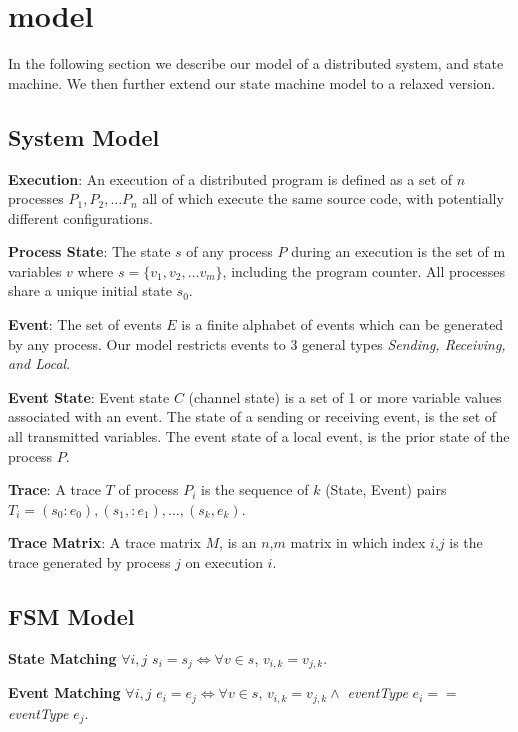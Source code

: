 \section{model}
\label{sec:model}

In the following section we describe our model of a distributed system, and
state machine. We then further extend our state machine model to a relaxed
version.


\subsection{System Model}

\noindent\textbf{Execution}: An execution of a distributed program is defined as a set
of $n$ processes $P_1, P_2, \dots P_n$ all of which execute the same source
code, with potentially different configurations.

\noindent\textbf{Process State}: The state $s$ of any process $P$ during an
execution is the set of m variables $v$ where $s = \{ v_1, v_2, \dots v_m \}$,
including the program counter.  All processes share a unique initial state
$s_0$.

\noindent\textbf{Event}: The set of events $E$ is a finite alphabet of events which can
be generated by any process. Our model restricts events to 3 general types
\textit{Sending, Receiving, and Local}.

\noindent\textbf{Event State}: Event state $C$ (channel state) is a set of 1 or more
variable values associated with an event. The state of a sending or receiving
event, is the set of all transmitted variables. The event state of a local
event, is the prior state of the process $P$.

\noindent\textbf{Trace}: A trace $T$ of process $P_i$ is the sequence of $k$ (State,
Event) pairs $T_i = {(s_0:e_0),(s_1,:e_1), \dots ,(s_k,e_k)}$.

\noindent\textbf{Trace Matrix}: A trace matrix $M$, is an $n$,$m$ matrix in which index
$i$,$j$ is the trace generated by process $j$ on execution $i$.

\subsection{FSM Model}

\noindent\textbf{State Matching} $\forall i,j$ $s_i = s_j \iff \forall v \in s$, $v_{i,k} = v_{j,k}$.

\noindent\textbf{Event Matching} $\forall i,j$ $e_i = e_j \iff \forall v \in
s$, $v_{i,k} = v_{j,k} \wedge$ \emph{eventType} $e_i == $ \emph{eventType} $e_j$.

